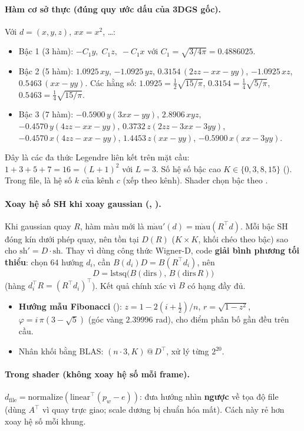 \paragraph{Hàm cơ sở thực (đúng quy ước dấu của 3DGS gốc).}
Với $d=(x,y,z)$, $xx=x^2$, \ldots:
\begin{itemize}
\item Bậc 1 (3 hàm): $-C_1y,\; C_1z,\; -C_1x$ với $C_1=\sqrt{3/4\pi}=0.4886025$.
\item Bậc 2 (5 hàm): $1.0925\,xy$, $-1.0925\,yz$, $0.3154\,(2zz-xx-yy)$, $-1.0925\,xz$, $0.5463\,(xx-yy)$. Các hằng số: $1.0925=\tfrac12\sqrt{15/\pi}$, $0.3154=\tfrac14\sqrt{5/\pi}$, $0.5463=\tfrac14\sqrt{15/\pi}$.
\item Bậc 3 (7 hàm): $-0.5900\,y(3xx-yy)$, $2.8906\,xyz$, $-0.4570\,y(4zz-xx-yy)$, $0.3732\,z(2zz-3xx-3yy)$, $-0.4570\,x(4zz-xx-yy)$, $1.4453\,z(xx-yy)$, $-0.5900\,x(xx-3yy)$.
\end{itemize}
Đây là các đa thức Legendre liên kết trên mặt cầu: $1+3+5+7=16=(L+1)^2$ với $L=3$. Số hệ số bậc cao $K\in\{0,3,8,15\}$ (). Trong file,  là hệ số $k$ của kênh $c$ (xếp theo kênh). Shader chọn bậc theo .

\paragraph{Xoay hệ số SH khi xoay gaussian (, ).}\label{s:shrot}
Khi gaussian quay $R$, hàm màu mới là $\mathrm{m\grave{a}u}'(d)=\mathrm{m\grave{a}u}(R^{\top}d)$. Mỗi bậc SH đóng kín dưới phép quay, nên tồn tại $D(R)$ ($K\times K$, khối chéo theo bậc) sao cho $\mathrm{sh}'=D\cdot\mathrm{sh}$. Thay vì dùng công thức Wigner-D, code \textbf{giải bình phương tối thiểu}: chọn 64 hướng $d_i$, cần $B(d_i)D=B(R^{\top}d_i)$, nên
\[
D=\mathrm{lstsq}\big(B(\mathrm{dirs}),\,B(\mathrm{dirs}\,R)\big)
\]
(hàng $d_i^{\top}R=(R^{\top}d_i)^{\top}$). Kết quả chính xác vì $B$ có hạng đầy đủ.
\begin{itemize}
\item \textbf{Hướng mẫu Fibonacci} (): $z=1-2(i+\tfrac12)/n$, $r=\sqrt{1-z^2}$, $\varphi=i\,\pi(3-\sqrt5)$ (góc vàng $2.39996$ rad), cho điểm phân bố gần đều trên cầu.
\item Nhân khối bằng BLAS: $(n\cdot3,K)\,@\,D^{\top}$, xử lý từng  $2^{20}$.
\end{itemize}

\paragraph{Trong shader (không xoay hệ số mỗi frame).}
$d_{\mathrm{file}}=\mathrm{normalize}(\mathrm{linear}^{\top}(p_w-e))$: đưa hướng nhìn \textbf{ngược} về tọa độ file (dùng $A^{\top}$ vì quay trực giao; scale dương bị chuẩn hóa mất). Cách này rẻ hơn xoay hệ số mỗi khung.
